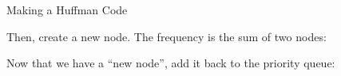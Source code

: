 \documentclass[programming]{../../mfcs}
\begin{document}
\begin{question}{Making a Huffman Code}
\begin{minipage}{0.29\textwidth}
\begin{center}
    \vspace{0.5em}

    \end{center}
    \vspace{0.49em}
    \end{minipage}
    \hfill
    \begin{minipage}{0.30\textwidth}
    {\small Then, create a new node. The frequency is the sum of two nodes:}\vspace{-1em}
    \begin{center}
    \hspace*{-2em}

    \hspace*{0em}
    \end{center}
    \end{minipage}
    \hfill
    \begin{minipage}{0.34\textwidth}
    Now that we have a ``new node'', add it back to the priority queue:
    \begin{center}
    \end{center}
    \vspace{0.9em}
    \end{minipage}


\end{question}
\end{document}
